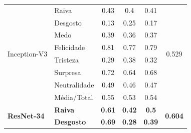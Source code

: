 \documentclass{beamer}
\begin{document}
\begin{frame}
\begin{table}[]
\begin{tabular}{llcccc}
\multirow{8}{*}{Inception-V3}     & Raiva                 & 0.43                                  & 0.4                                    & 0.41                                  & \multirow{8}{*}{0.529}                \\
                                       & Desgosto              & 0.13                                  & 0.25                                   & 0.17                                  &                                       \\
                                       & Medo                  & 0.39                                  & 0.36                                   & 0.37                                  &                                       \\
                                       & Felicidade            & 0.81                                  & 0.77                                   & 0.79                                  &                                       \\
                                       & Tristeza              & 0.29                                  & 0.38                                   & 0.32                                  &                                       \\
                                       & Surpresa              & 0.72                                  & 0.64                                   & 0.68                                  &                                       \\
                                       & Neutralidade          & 0.49                                  & 0.46                                   & 0.47                                  &                                       \\
                                       & Média/Total           & 0.55                                  & 0.53                                   & 0.54                                  &                                       \\ \hline
\multirow{8}{*}{\textbf{ResNet-34}} & \textbf{Raiva}        & \textbf{0.61}                         & \textbf{0.42}                          & \textbf{0.5}                          & \multirow{8}{*}{\textbf{0.604}}       \\
                                       & \textbf{Desgosto}     & \textbf{0.69}                         & \textbf{0.28}                          & \textbf{0.39}                         &                                       \\

\end{tabular}
\end{table}
\end{frame}
\end{document}
